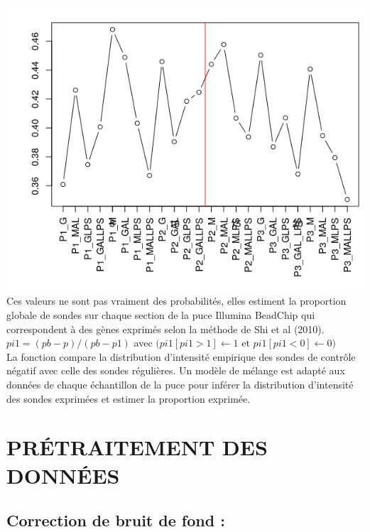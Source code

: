 \documentclass[a4paper,10pt]{article}
\begin{document}
\begin{center}
 \includegraphics[scale=0.5]{../../R/output/propexpr.png}
 Ces valeurs ne sont pas vraiment des probabilités, elles estiment la proportion globale de sondes sur chaque section de la puce Illumina BeadChip qui correspondent à des gènes exprimés selon la méthode de Shi et al (2010).
 $pi1= (pb-p)/(pb-p1) $ avec $(pi1[pi1 > 1] \leftarrow 1 $ et $pi1[pi1 < 0] \leftarrow 0)$\\
 La fonction compare la distribution d’intensité empirique des sondes de contrôle négatif avec celle des sondes régulières. 
 Un modèle de mélange est adapté aux données de chaque échantillon de la puce pour inférer la distribution d’intensité des sondes exprimées et estimer la proportion exprimée.
\end{center}

\section{PR\'{E}TRAITEMENT DES DONN\'{E}ES }
\subsection{Correction de bruit de fond :}
\end{document}

